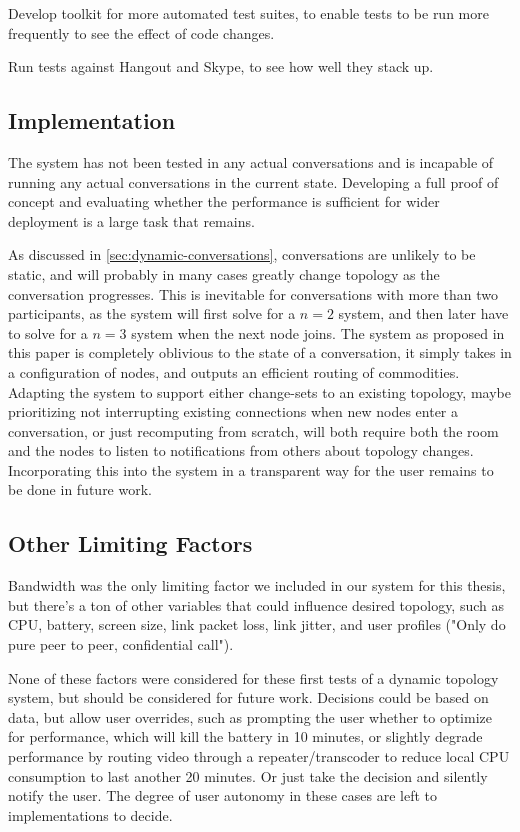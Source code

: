 Develop toolkit for more automated test suites, to enable tests to be run more frequently to see the effect of code changes.

Run tests against Hangout and Skype, to see how well they stack up.

\subsection{Implementation}

The system has not been tested in any actual conversations and is incapable of running any actual conversations in the current state. Developing a full proof of concept and evaluating whether the performance is sufficient for wider deployment is a large task that remains.

As discussed in \autoref{sec:dynamic-conversations}, conversations are unlikely to be static, and will probably in many cases greatly change topology as the conversation progresses. This is inevitable for conversations with more than two participants, as the system will first solve for a $n=2$ system, and then later have to solve for a $n=3$ system when the next node joins. The system as proposed in this paper is completely oblivious to the state of a conversation, it simply takes in a configuration of nodes, and outputs an efficient routing of commodities. Adapting the system to support either change-sets to an existing topology, maybe prioritizing not interrupting existing connections when new nodes enter a conversation, or just recomputing from scratch, will both require both the room and the nodes to listen to notifications from others about topology changes. Incorporating this into the system in a transparent way for the user remains to be done in future work.


\subsection{Other Limiting Factors}

Bandwidth was the only limiting factor we included in our system for this thesis, but there's a ton of other variables that could influence desired topology, such as CPU, battery, screen size, link packet loss, link jitter, and user profiles ("Only do pure peer to peer, confidential call").

None of these factors were considered for these first tests of a dynamic topology system, but should be considered for future work. Decisions could be based on data, but allow user overrides, such as prompting the user whether to optimize for performance, which will kill the battery in 10 minutes, or slightly degrade performance by routing video through a repeater/transcoder to reduce local CPU consumption to last another 20 minutes. Or just take the decision and silently notify the user. The degree of user autonomy in these cases are left to implementations to decide.
